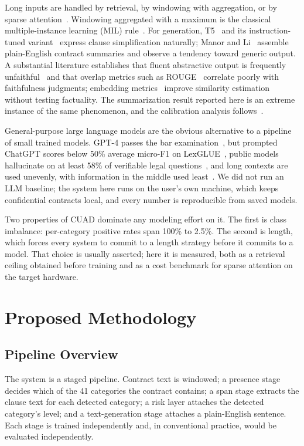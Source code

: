 \documentclass[journal]{IEEEtran}
\begin{document}
Long inputs are handled by retrieval, by windowing with aggregation, or by sparse
attention~\cite{longformer}. Windowing aggregated with a maximum is the classical multiple-instance
learning (MIL) rule~\cite{mil}. For generation, T5~\cite{t5} and its instruction-tuned
variant~\cite{flan} express clause simplification naturally; Manor and Li~\cite{manor} assemble
plain-English contract summaries and observe a tendency toward generic output. A substantial
literature establishes that fluent abstractive output is frequently unfaithful~\cite{maynez,factcc}
and that overlap metrics such as ROUGE~\cite{rouge} correlate poorly with faithfulness judgments;
embedding metrics~\cite{bertscore} improve similarity estimation without testing factuality. The
summarization result reported here is an extreme instance of the same phenomenon, and the
calibration analysis follows~\cite{calibration}.

General-purpose large language models are the obvious alternative to a pipeline of small trained
models. GPT-4 passes the bar examination~\cite{gpt4bar}, but prompted ChatGPT scores below 50\%
average micro-F1 on LexGLUE~\cite{chatgptlexglue}, public models hallucinate on at least 58\% of
verifiable legal questions~\cite{fictions}, and long contexts are used unevenly, with information in
the middle used least~\cite{lostmiddle}. We did not run an LLM baseline; the system here runs on the
user's own machine, which keeps confidential contracts local, and every number is reproducible from
saved models.

Two properties of CUAD dominate any modeling effort on it. The first is class imbalance:
per-category positive rates span 100\% to 2.5\%. The second is length, which forces every system to
commit to a length strategy before it commits to a model. That choice is usually asserted; here it
is measured, both as a retrieval ceiling obtained before training and as a cost benchmark for
sparse attention on the target hardware.

\section{Proposed Methodology}

\subsection{Pipeline Overview}
The system is a staged pipeline. Contract text is windowed; a presence stage decides which of the
41 categories the contract contains; a span stage extracts the clause text for each detected
category; a risk layer attaches the detected category's level; and a text-generation stage attaches
a plain-English sentence. Each stage is trained independently and, in conventional practice, would
be evaluated independently.
\end{document}

